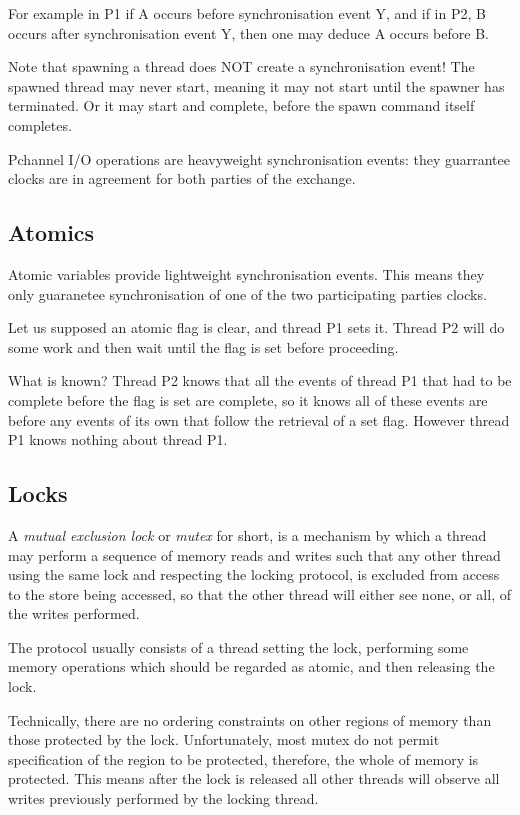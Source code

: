 \documentclass[oneside]{book}
\begin{document}
For example in P1 if A occurs before synchronisation event Y,
and if in P2, B occurs after synchronisation event Y, then
one may deduce A occurs before B.

Note that spawning a thread does NOT create a synchronisation
event! The spawned thread may never start, meaning it may not
start until the spawner has terminated. Or it may start
and complete, before the spawn command itself completes.

Pchannel I/O operations are heavyweight synchronisation events:
they guarrantee clocks are in agreement for both parties
of the exchange.

\subsection{Atomics}
Atomic variables provide lightweight synchronisation events.
This means they only guaranetee synchronisation of one of the
two participating parties clocks.

Let us supposed an atomic flag is clear, and thread P1 sets it.
Thread P2 will do some work and then wait until the flag is set
before proceeding. 

What is known? Thread P2 knows that all the events of 
thread P1 that had to be complete before the flag is set
are complete, so it knows all of these events are before
any events of its own that follow the retrieval of a set flag.
However thread P1 knows nothing about thread P1.

\subsection{Locks}
A {\em mutual exclusion lock} or {\em mutex} for short,
is a mechanism by which a thread may perform a sequence of
memory reads and writes such that any other thread using
the same lock and respecting the locking protocol,
is excluded from access to the store being accessed,
so that the other thread will either see none, or all,
of the writes performed.

The protocol usually consists of a thread setting the lock,
performing some memory operations which should be regarded
as atomic, and then releasing the lock.

Technically, there are no ordering constraints on other
regions of memory than those protected by the lock.
Unfortunately, most mutex do not permit specification
of the region to be protected, therefore, the whole of
memory is protected. This means after the lock is released
all other threads will observe all writes previously
performed by the locking thread.
\end{document}
